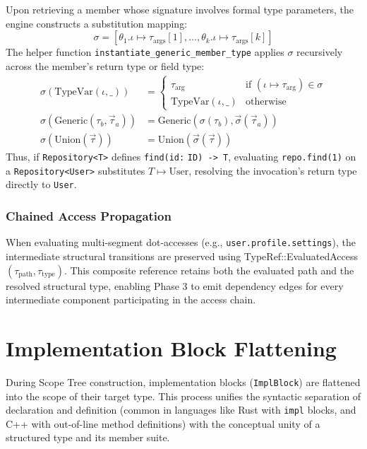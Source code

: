 Upon retrieving a member whose signature involves formal type parameters,
the engine constructs a substitution mapping:
$$\sigma = [ \theta_1.\iota \mapsto \tau_{\text{args}}[1], \ldots,
\theta_k.\iota \mapsto \tau_{\text{args}}[k] ]$$
The helper function \texttt{instantiate\_generic\_member\_type} applies $\sigma$
recursively across the member's return type or field type:
\begin{align*}
  \sigma(\text{TypeVar}(\iota, \_)) &=
  \begin{cases}
    \tau_{\text{arg}} & \text{if } (\iota \mapsto \tau_{\text{arg}})
    \in \sigma \\
    \text{TypeVar}(\iota, \_) & \text{otherwise}
  \end{cases} \\
  \sigma(\text{Generic}(\tau_b, \vec{\tau}_a)) &=
  \text{Generic}(\sigma(\tau_b), \vec{\sigma}(\vec{\tau}_a)) \\
  \sigma(\text{Union}(\vec{\tau})) &= \text{Union}(\vec{\sigma}(\vec{\tau}))
\end{align*}
Thus, if \texttt{Repository<T>} defines \texttt{find(id:} \texttt{ID)
-> T}, evaluating
\texttt{repo.}\-\texttt{find(1)} on a \texttt{Repository<User>} substitutes $T
\mapsto \text{User}$,
resolving the invocation's return type directly to \texttt{User}.

\subsubsection{Chained Access Propagation}

When evaluating multi-segment dot-accesses (e.g.,
\texttt{user.profile.settings}),
the intermediate structural transitions are preserved using
TypeRef::Evaluated\-Access$(\tau_{\text{path}}, \tau_{\text{type}})$.
This composite reference retains both the evaluated path and the resolved
structural type, enabling Phase 3 to emit dependency edges for every
intermediate component participating in the access chain.

\section{Implementation Block Flattening}
\label{sec:impl_flattening}

During Scope Tree construction, implementation blocks
(\texttt{ImplBlock}) are flattened into the scope of their target
type. This process unifies the syntactic separation of declaration
and definition (common in languages like Rust with \texttt{impl} blocks,
and C++ with out-of-line method definitions) with the conceptual unity
of a structured type and its member suite.

